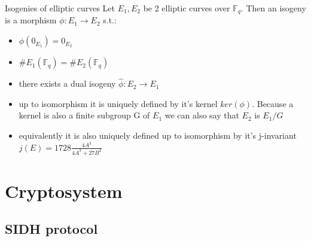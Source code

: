 \documentclass{beamer}
\begin{document}
\begin{frame}{Isogenies of elliptic curves}  %
Let $E_1,E_2$ be 2 elliptic curves over $\mathbb{F}_q$. Then an isogeny is a morphism $\phi: E_1 \to E_2$ s.t.:
\begin{itemize}[\textbullet]
	\item $\phi(0_{E_1})= 0_{E_2}$
	\item $\#E_1(\mathbb{F}_q) = \#E_2(\mathbb{F}_q)$
	\item there exists a dual isogeny $\hat{\phi}: E_2 \to E_1$
	\item up to isomorphism it is uniquely defined by it's kernel $ker(\phi)$. Because a kernel is also a finite subgroup G of $E_1$ we can also say that $E_2$ is $E_1/G$
	\item equivalently it is also uniquely defined up to isomorphism by it's j-invariant $j(E)=1728\frac{4A^3}{4A^3+27B^2}$
\end{itemize}


\end{frame}



\section{Cryptosystem}

\subsection{SIDH protocol}
\end{document}
